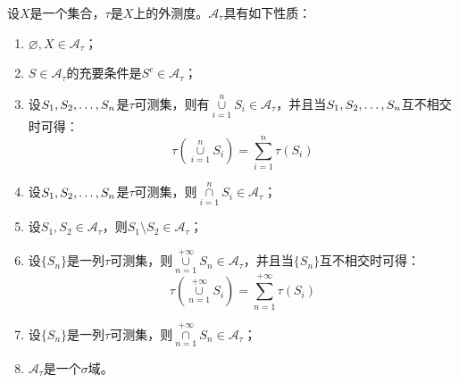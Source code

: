 \begin{property}\label{prop:tauMeasurableSetCollection}
	设$X$是一个集合，$\tau$是$X$上的外测度。$\mathscr{A}_{\tau}$具有如下性质：
	\begin{enumerate}
		\item $\varnothing,X\in\mathscr{A}_{\tau}$； 
		\item $S\in\mathscr{A}_{\tau}$的充要条件是$S^c\in\mathscr{A}_{\tau}$；
		\item 设$S_1, S_2, \dots, S_{n}$是$\tau$可测集，则有$\underset{i=1}{\overset{n}{\cup}}S_i\in\mathscr{A}_{\tau}$，并且当$S_1, S_2, \dots, S_{n}$互不相交时可得：
		\begin{equation*}
			\tau\left(\underset{i=1}{\overset{n}{\cup}}S_i\right)=\sum_{i=1}^{n}\tau(S_i)
		\end{equation*}
		\item 设$S_1, S_2, \dots, S_{n}$是$\tau$可测集，则$\underset{i=1}{\overset{n}{\cap}}S_i\in\mathscr{A}_{\tau}$；
		\item 设$S_1,S_2\in\mathscr{A}_{\tau}$，则$S_1\setminus S_2\in\mathscr{A}_{\tau}$；
		\item 设$\{S_n\}$是一列$\tau$可测集，则$\underset{n=1}{\overset{+\infty}{\cup}}S_n\in\mathscr{A}_{\tau}$，并且当$\{S_n\}$互不相交时可得：
		\begin{equation*}
			\tau\left(\underset{n=1}{\overset{+\infty}{\cup}}S_i\right)=\sum_{n=1}^{+\infty}\tau(S_i)
		\end{equation*}
		\item 设$\{S_n\}$是一列$\tau$可测集，则$\underset{n=1}{\overset{+\infty}{\cap}}S_n\in\mathscr{A}_{\tau}$；
		\item $\mathscr{A}_\tau$是一个$\sigma$域。
	\end{enumerate}
\end{property}
